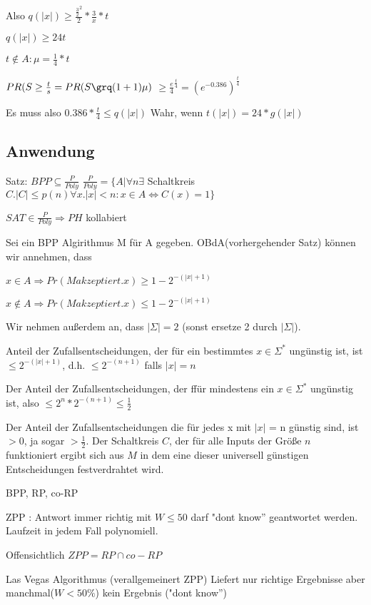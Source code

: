 Also $q(|x|) \geq \frac{\frac{3}{2}^2}{2} * \frac{3}{x} * t$

$q(|x|) \geq 24 t$

$t \notin A : \mu = \frac{1}{4} * t $

$ PR( S\geq \frac{t}{s} = PR (S \grq (1+1) \mu ) $
$ \geq \frac{e}{4}^\frac{t}{4} = (e^{-0.386})^\frac{t}{4}$

Es muss also
$0.386 * \frac{t}{4} \leq q(|x|)$
Wahr, wenn $t(|x|)=24 * g(|x|)$

\subsection{Anwendung}
Satz: $BPP \subseteq \frac{P}{Poly}$
$\frac{P}{Poly} = \{A | \forall n \exists$  Schaltkreis $C. |C| \leq p(n) \forall x . |x| < n : x \in A \Leftrightarrow C(x) = 1\} $

$SAT \in \frac{P}{Poly} \Rightarrow PH$ kollabiert

\begin{beweis}
Sei ein BPP Algirithmus M für A gegeben. OBdA(vorhergehender Satz) können wir annehmen, dass

$ x \in A  \Rightarrow Pr (M akzeptiert . x) \geq 1-2^{-(|x| + 1)}$

$ x \notin  A  \Rightarrow Pr (M akzeptiert . x) \leq 1-2^{-(|x| + 1)}$

Wir nehmen außerdem an, dass $| \Sigma  | = 2$ (sonst ersetze 2 durch $| \Sigma|$).

Anteil der Zufallsentscheidungen, der für ein bestimmtes $x\in \Sigma^*$
ungünstig ist, ist $\leq 2 ^{-(|x| + 1)}$, d.h. $\leq 2^{-(n+1)}$ falls
$|x| = n$

Der Anteil der Zufallsentscheidungen, der ffür mindestens ein $x\in \Sigma^*$
ungünstig ist, also $\leq 2^n * 2^{-(n+1)} \leq \frac{1}{2}$

Der Anteil der Zufallsentscheidungen die für jedes x mit $|x|$ = n günstig  sind,
ist $>0$, ja sogar $> \frac{1}{2}$. Der Schaltkreis $C$, der für alle Inputs der
Größe $n$ funktioniert ergibt sich aus $M$ in dem eine dieser universell
günstigen Entscheidungen festverdrahtet wird.
\end{beweis}

BPP, RP, co-RP \checked

ZPP : Antwort immer richtig mit $W\leq 50$ darf "dont know'' geantwortet werden. Laufzeit in jedem Fall polynomiell.

Offensichtlich $ZPP = RP \cap co - RP$

Las Vegas Algorithmus (verallgemeinert ZPP) Liefert nur richtige Ergebnisse aber manchmal($W<50\%$) kein Ergebnis ("dont know'')

